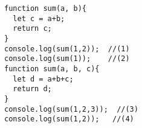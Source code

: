 \begin{Verbatim}[]
function sum(a, b){
  let c = a+b;
  return c;
}
console.log(sum(1,2));  //(1)
console.log(sum(1));    //(2)
function sum(a, b, c){
  let d = a+b+c;
  return d;
}
console.log(sum(1,2,3));  //(3)
console.log(sum(1,2));   //(4)
\end{Verbatim}
